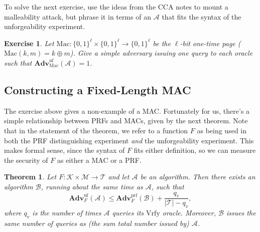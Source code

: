 \documentclass[11pt]{article}
\newtheorem{exercise}{Exercise}
\newtheorem{theorem}{Theorem}
\newcommand{\msgs}{\mathcal{M}}
\newcommand{\keys}{\mathcal{K}}
\newcommand{\MAC}{\mathrm{Mac}}
\newcommand{\Vrfy}{\mathrm{Vrfy}}
\newcommand{\tags}{\mathcal{T}}
\newcommand{\calA}{\mathcal{A}}
\newcommand{\calB}{\mathcal{B}}
\newcommand{\Adv}{\mathbf{Adv}}
\newcommand{\AdvPRF}[2]{\Adv^{\mathrm{prf}}_{#1}({#2})}
\newcommand{\bits}{\{0,1\}}
\newcommand{\AdvUF}[2]{\Adv^{\mathrm{uf}}_{#1}({#2})}
\begin{document}
To solve the next exercise, use the ideas from the CCA notes to mount a
malleability attack, but phrase it in terms of an $\calA$ that fits the
syntax of the unforgeability experiment.
\begin{exercise}
    Let $\MAC:\bits^\ell\times\bits^\ell\to\bits^\ell$ be the $\ell$-bit
    one-time page ($\MAC(k,m)=k\oplus m$). Give a simple adversary issuing
    one query to each oracle such that $\AdvUF{\MAC}{\calA}=1$.
\end{exercise}

\subsection{Constructing a Fixed-Length MAC}

The exercise above gives a non-example of a MAC. Fortunately for us, there's a
simple relationship between PRFs and MACs, given by the next theorem. Note that
in the statement of the theorem, we refer to a function $F$ as being used in
both the PRF distinguishing experiment \emph{and} the unforgeability
experiment. This makes formal sense, since the syntax of $F$ fits either
definition, so we can measure the security of $F$ as either a MAC or a PRF.
\begin{theorem}
    Let $F  : \keys\times\msgs  \to  \tags$ and let $\calA$ be an
    algorithm. Then there exists an algorithm $\calB$, running about
    the same time as $\calA$, such that
    \[
        \AdvUF{F}{\calA} \leq \AdvPRF{F}{\calB} + \frac{q_v}{|\tags|-q_v},
    \]
    where $q_v$ is the number of times $\calA$ queries its $\Vrfy$ oracle.
    Moreover, $\calB$ issues the same number of queries as (the sum total number
    issued by) $\calA$.
\end{theorem}
\end{document}
